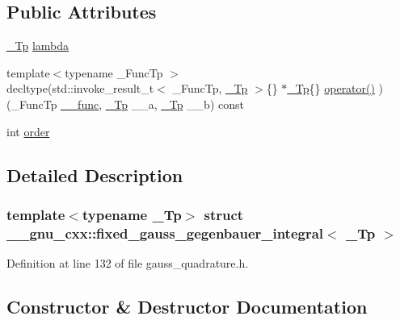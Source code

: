 \subsection*{Public Attributes}
\begin{DoxyCompactItemize}
\item 
\hyperlink{namespace____gnu__cxx_a3b19a9c800ca194374ef9172290f7d79}{\+\_\+\+Tp} \hyperlink{struct____gnu__cxx_1_1fixed__gauss__gegenbauer__integral_a920e1b46f20a45756e3cd563ab7fd1e3}{lambda}
\item 
{\footnotesize template$<$typename \+\_\+\+Func\+Tp $>$ }\\decltype(std\+::invoke\+\_\+result\+\_\+t$<$ \+\_\+\+Func\+Tp, \hyperlink{namespace____gnu__cxx_a3b19a9c800ca194374ef9172290f7d79}{\+\_\+\+Tp} $>$\{\} $\ast$\hyperlink{namespace____gnu__cxx_a3b19a9c800ca194374ef9172290f7d79}{\+\_\+\+Tp}\{\} \hyperlink{struct____gnu__cxx_1_1fixed__gauss__gegenbauer__integral_a16f67fec7b9c704fa11076db362ca938}{operator()} )(\+\_\+\+Func\+Tp \hyperlink{namespace____gnu__cxx_af2b2f0c7a2ae72b922b1afefae5a65b2}{\+\_\+\+\_\+func}, \hyperlink{namespace____gnu__cxx_a3b19a9c800ca194374ef9172290f7d79}{\+\_\+\+Tp} \+\_\+\+\_\+a, \hyperlink{namespace____gnu__cxx_a3b19a9c800ca194374ef9172290f7d79}{\+\_\+\+Tp} \+\_\+\+\_\+b) const
\item 
int \hyperlink{struct____gnu__cxx_1_1fixed__gauss__gegenbauer__integral_ae0cf76d27bf84a9664b8fa94ad1037ea}{order}
\end{DoxyCompactItemize}


\subsection{Detailed Description}
\subsubsection*{template$<$typename \+\_\+\+Tp$>$\newline
struct \+\_\+\+\_\+gnu\+\_\+cxx\+::fixed\+\_\+gauss\+\_\+gegenbauer\+\_\+integral$<$ \+\_\+\+Tp $>$}



Definition at line 132 of file gauss\+\_\+quadrature.\+h.



\subsection{Constructor \& Destructor Documentation}
\mbox{\label{struct____gnu__cxx_1_1fixed__gauss__gegenbauer__integral_a2581f15261fcf06cffd06c99c9cca97e}} 
